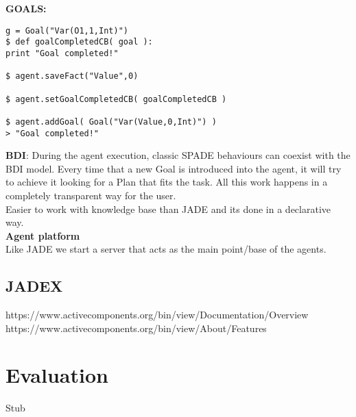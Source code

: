\documentclass[a4paper, 11pt]{article}
\begin{document}
\textbf{GOALS:} \\
\begin{verbatim}
g = Goal("Var(O1,1,Int)")
$ def goalCompletedCB( goal ):
print "Goal completed!"

$ agent.saveFact("Value",0)

$ agent.setGoalCompletedCB( goalCompletedCB )

$ agent.addGoal( Goal("Var(Value,0,Int)") )
> "Goal completed!"
\end{verbatim}

\textbf{BDI}: During the agent execution, classic SPADE behaviours can coexist with the BDI model. Every time that a new Goal is introduced into the agent, it will try to achieve it looking for a Plan that fits the task. All this work happens in a completely transparent way for the user. \\
Easier to work with knowledge base than JADE and its done in a declarative way. \\

\textbf{Agent platform} \\
Like JADE we start a server that acts as the main point/base of the agents.

\subsection{JADEX}

https://www.activecomponents.org/bin/view/Documentation/Overview \\
https://www.activecomponents.org/bin/view/About/Features \\


\section{Evaluation}
Stub
\end{document}
